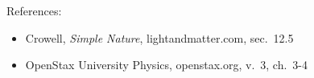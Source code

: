 References:
\begin{itemize}
\item Crowell, \emph{Simple Nature}, lightandmatter.com, sec.~12.5
\item OpenStax University Physics, openstax.org, v.~3, ch.~3-4
\end{itemize}
